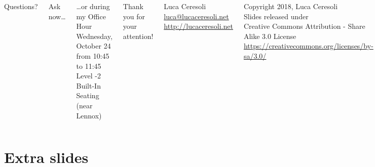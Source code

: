 \documentclass[xetex,table,aspectratio=169]{beamer}
\begin{document}
\begin{frame}
  \begin{columns}
    \center

    {\Huge Questions?}

    \vspace{0.05\textheight}

    Ask now\dots

    \vspace{0.05\textheight}

    \dots{}or during my Office Hour\\
    Wednesday, October 24\\
    from 10:45 to 11:45\\
    Level -2 Built-In Seating\\
    (near Lennox)

    \center

    {\Large Thank you for your attention!}

    \vspace{0.15\textheight}

    {\Large Luca Ceresoli}\\
    \href{mailto:luca@lucaceresoli.net}{luca@lucaceresoli.net}\\
    \url{http://lucaceresoli.net}

    \vspace{0.05\textheight}

    \tiny
    \textcopyright{} Copyright 2018, Luca Ceresoli\\
    Slides released under\\
    Creative Commons Attribution - Share Alike 3.0 License \\
    \url{https://creativecommons.org/licenses/by-sa/3.0/} \\
  \end{columns}
\end{frame}

\appendix

\section{Extra slides}
\end{document}
